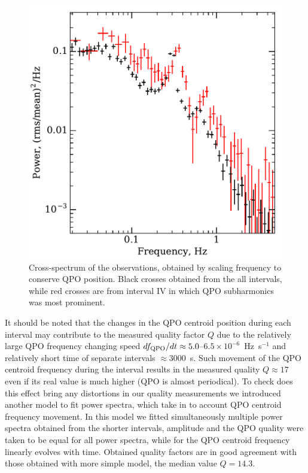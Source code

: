 \documentclass[a4paper,fleqn,usenatbib]{mnras}
\begin{document}
\begin{figure}
        \includegraphics[width=\columnwidth]{subharmonics2.pdf}
        \caption{Cross-spectrum of the observations, obtained by scaling frequency to conserve QPO position.
        Black crosses obtained from the all intervals, while red crosses are from interval IV in which QPO subharmonics was most prominent.}
        \label{fig:cospec_tracked}
\end{figure}

It should be noted that the changes in the QPO centroid position during each interval may contribute to the measured quality factor $Q$ due to the relatively large QPO frequency changing speed $d{f}_{\rm QPO}/dt \approx 5.0$--$6.5\times10^{-6}$~Hz~s$^{-1}$ and relatively short time of separate intervals $\approx3000$~s.
Such movement of the QPO centroid frequency during the interval results in the measured quality $Q \approx 17$ even if its real value is much higher (QPO is almost periodical).
To check does this effect bring any distortions in our quality measurements we introduced another model to fit power spectra, which take in to account QPO centroid frequency movement. 
In this model we fitted simultaneously multiple power spectra obtained from the shorter intervals, amplitude and the QPO quality were taken to be equal for all power spectra, while for the QPO centroid frequency  linearly evolves with time.
Obtained quality factors are in good agreement with those obtained with more simple model, the median value $Q=14.3$.
\end{document}
